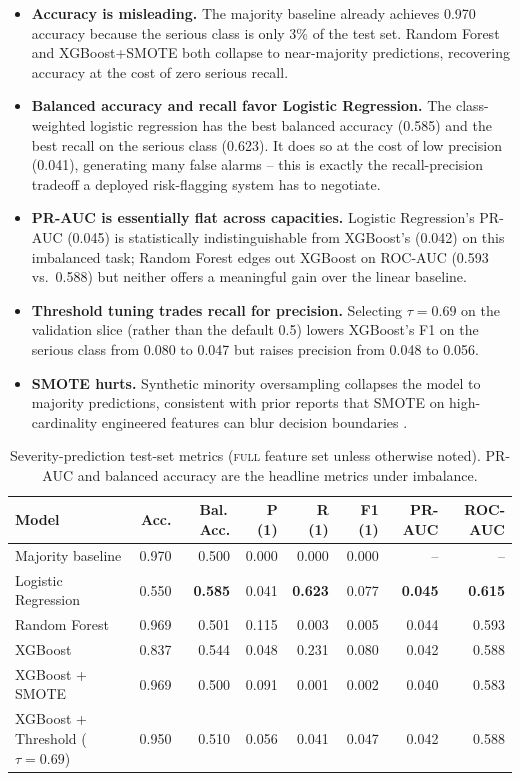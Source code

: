\documentclass{article}
\begin{document}
\begin{itemize}
\item \textbf{Accuracy is misleading.} The majority baseline already
achieves 0.970 accuracy because the serious class is only 3\% of the test
set. Random Forest and XGBoost+SMOTE both collapse to near-majority
predictions, recovering accuracy at the cost of zero serious recall.
\item \textbf{Balanced accuracy and recall favor Logistic Regression.} The
class-weighted logistic regression has the best balanced accuracy (0.585) and
the best recall on the serious class (0.623). It does so at the cost of low
precision (0.041), generating many false alarms -- this is exactly the
recall-precision tradeoff a deployed risk-flagging system has to negotiate.
\item \textbf{PR-AUC is essentially flat across capacities.} Logistic
Regression's PR-AUC (0.045) is statistically indistinguishable from
XGBoost's (0.042) on this imbalanced task; Random Forest edges out XGBoost on
ROC-AUC (0.593 vs.\ 0.588) but neither offers a meaningful gain over the
linear baseline.
\item \textbf{Threshold tuning trades recall for precision.} Selecting
$\tau\!=\!0.69$ on the validation slice (rather than the default 0.5) lowers
XGBoost's F1 on the serious class from 0.080 to 0.047 but raises precision
from 0.048 to 0.056.
\item \textbf{SMOTE hurts.} Synthetic minority oversampling collapses the
model to majority predictions, consistent with prior reports that SMOTE on
high-cardinality engineered features can blur decision boundaries
\cite{he2009imbalanced}.
\end{itemize}

\begin{table}[h]
\centering
\caption{Severity-prediction test-set metrics (\textsc{full} feature set unless
otherwise noted). PR-AUC and balanced accuracy are the headline metrics under
imbalance.}
\label{tab:summary}
\setlength{\tabcolsep}{4pt}
\begin{tabular}{lrrrrrrr}
\toprule
Model & Acc. & Bal.\,Acc. & P (1) & R (1) & F1 (1) & PR-AUC & ROC-AUC \\
\midrule
Majority baseline           & 0.970 & 0.500 & 0.000 & 0.000 & 0.000 & --     & --     \\
Logistic Regression         & 0.550 & \textbf{0.585} & 0.041 & \textbf{0.623} & 0.077 & \textbf{0.045} & \textbf{0.615} \\
Random Forest               & 0.969 & 0.501 & 0.115 & 0.003 & 0.005 & 0.044 & 0.593 \\
XGBoost                     & 0.837 & 0.544 & 0.048 & 0.231 & 0.080 & 0.042 & 0.588 \\
XGBoost + SMOTE             & 0.969 & 0.500 & 0.091 & 0.001 & 0.002 & 0.040 & 0.583 \\
XGBoost + Threshold ($\tau\!=\!0.69$) & 0.950 & 0.510 & 0.056 & 0.041 & 0.047 & 0.042 & 0.588 \\
\bottomrule
\end{tabular}
\end{table}
\end{document}
